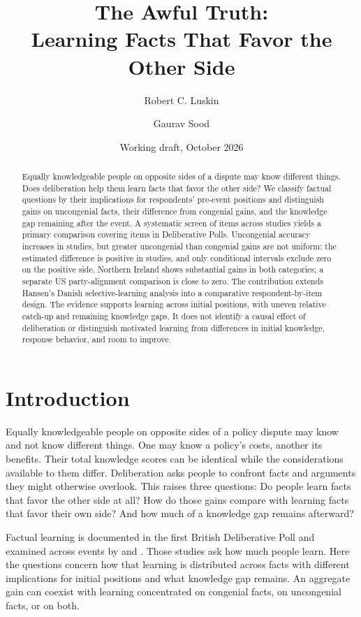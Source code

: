 \documentclass[11pt]{article}
\title{The Awful Truth:\\Learning Facts That Favor the Other Side}
\author{Robert C. Luskin \and Gaurav Sood}
\date{Working draft, October 2026}
\begin{document}
\maketitle
\begin{abstract}
\noindent Equally knowledgeable people on opposite sides of a dispute may know different things. Does deliberation help them learn facts that favor the other side? We classify factual questions by their implications for respondents' pre-event positions and distinguish gains on uncongenial facts, their difference from congenial gains, and the knowledge gap remaining after the event. A systematic screen of \inventoryItems{} items across \inventoryStudies{} studies yields a primary comparison covering \primaryItems{} items in \primaryStudies{} Deliberative Polls. Uncongenial accuracy increases in \positiveGainStudies{} studies, but greater uncongenial than congenial gains are not uniform: the estimated difference is positive in \positiveDifferenceStudies{} studies, and only \positiveIntervalStudies{} conditional intervals exclude zero on the positive side. Northern Ireland shows substantial gains in both categories; a separate US party-alignment comparison is close to zero. The contribution extends Hansen's Danish selective-learning analysis into a comparative respondent-by-item design. The evidence supports learning across initial positions, with uneven relative catch-up and remaining knowledge gaps. It does not identify a causal effect of deliberation or distinguish motivated learning from differences in initial knowledge, response behavior, and room to improve.
\end{abstract}

\section{Introduction}

Equally knowledgeable people on opposite sides of a policy dispute may know and not know different things. One may know a policy's costs, another its benefits. Their total knowledge scores can be identical while the considerations available to them differ. Deliberation asks people to confront facts and arguments they might otherwise overlook. This raises three questions: Do people learn facts that favor the other side at all? How do those gains compare with learning facts that favor their own side? And how much of a knowledge gap remains afterward?

Factual learning is documented in the first British Deliberative Poll and examined across events by \citet{luskin2002} and \citet{luskin2026learning}. Those studies ask how much people learn. Here the questions concern how that learning is distributed across facts with different implications for initial positions and what knowledge gap remains. An aggregate gain can coexist with learning concentrated on congenial facts, on uncongenial facts, or on both.
\end{document}
